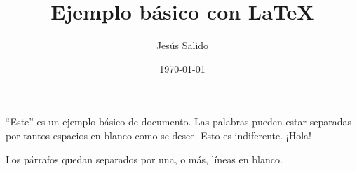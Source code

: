 \documentclass[11pt,a4paper]{article}
\title{Ejemplo básico con \LaTeX}
\author{Jesús Salido}
\date{\today}
\begin{document}
\maketitle


“Este” es un ejemplo básico de documento. Las     palabras        pueden estar       separadas por tantos         espacios     en blanco   como se desee. Esto es indiferente. ¡Hola!





           Los párrafos quedan separados por una, o más, líneas en blanco.
           
           
           
\end{document}
